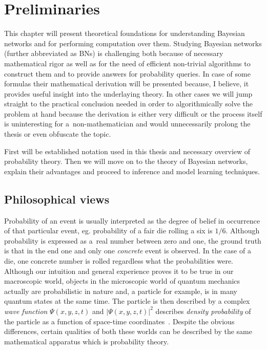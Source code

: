 \documentclass[english,cover]{fitthesis} %
\newcommand{\term}[1]{\emph{#1}}           %
\begin{document}
\chapter{Preliminaries}\label{ch:preliminaries}
This chapter will present theoretical foundations for understanding Bayesian networks and for performing computation over them. Studying Bayesian networks (further abbreviated as BNs) is challenging both because of necessary mathematical rigor as well as for the need of efficient non-trivial algorithms to construct them and to provide answers for probability queries. In case of some formulas their mathematical derivation will be presented because, I believe, it provides useful insight into the underlaying theory. In other cases we will jump straight to the practical conclusion needed in order to algorithmically solve the problem at hand because the derivation is either very difficult or the process itself is uninteresting for a~non-mathematician and would unnecessarily prolong the thesis or even obfuscate the topic.

First will be established notation used in this thesis and necessary overview of probability theory. Then we will move on to the theory of Bayesian networks, explain their advantages and proceed to inference and model learning techniques.



\section{Philosophical views}
Probability of an event is usually interpreted as the degree of belief in occurrence of that particular event, eg. probability of a fair die rolling a six is $1/6$. Although probability is expressed as a~real number between zero and one, the ground truth is that in the end one and only one \emph{concrete} event is observed. In the case of a die, one concrete number is rolled regardless what the probabilities were. Although our intuition and general experience proves it to be true in our macroscopic world, objects in the microscopic world of quantum mechanics actually are probabilistic in nature and, a particle for example, is in many quantum states at the same time. The particle is then described by a complex \term{wave function} $\Psi(x,y,z,t)$ and $\vert\Psi(x,y,z,t)\vert^2$ describes \term{density probability} of the particle as a function of space-time coordinates~\cite[p.~1044]{hrw_physics}. Despite the obvious differences, certain qualities of both these worlds can be described by the same mathematical apparatus which is probability theory.
\end{document}
